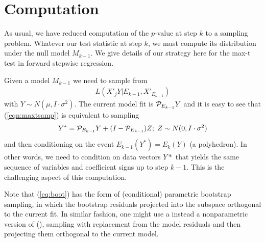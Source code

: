 \documentclass{article}
\begin{document}
\section{Computation}
\label{sec:computation}

As usual, we have reduced computation of the $p$-value at step $k$ to a sampling problem. Whatever our test statistic at step $k$, we must compute its distribution under the null model $M_{k-1}$. We give details of our  strategy here for the max-t test in forward stepwise regression.


Given a model $M_{k-1}$   we need to sample from 
\begin{eqnarray}
L(X'_jY | E_{k-1},X'_{E_{k-1}})
\label{eqn:maxtsamp}
\end{eqnarray}
with $Y\sim N(\mu, I \cdot \sigma^2)$.
The current model fit is $\mathcal{P}_{E_{k-1}} Y$ and it is easy to see that (\ref{eqn:maxtsamp})  is equivalent to sampling
\begin{eqnarray}
Y^*=\mathcal{P}_{E_{k-1}} Y + (I- \mathcal{P}_{E_{k-1}}) Z; \;Z\sim N(0,I\cdot\sigma^2)
\label{eq:boot}
\end{eqnarray}
and then conditioning on the event $E_{k-1}(Y^*)= E_k(Y)$ (a polyhedron).
In other words, we need to condition on data vectors  $Y*$ that yields the same
sequence of variables and coefficient signs up to step $k-1$. This is the challenging aspect of this computation.

Note that  (\ref{eq:boot})  has the form of  (conditional) parametric bootstrap sampling, in which the bootstrap residuals projected into the subspace
orthogonal to the current fit. In similar fashion, one might use a instead a nonparametric version of (), sampling
with replacement from the model residuals and then projecting them orthogonal to the current model.
\end{document}
